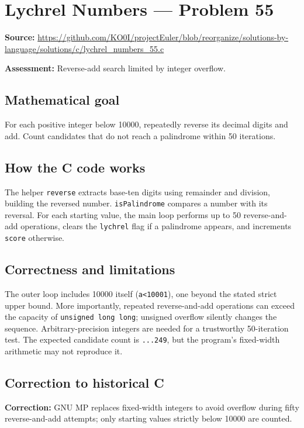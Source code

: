 \section{Lychrel Numbers --- Problem 55}
\label{prob:55}
\noindent\textbf{Source:} \url{https://github.com/KO0I/projectEuler/blob/reorganize/solutions-by-language/solutions/c/lychrel_numbers_55.c}

\noindent\textbf{Assessment:} Reverse-add search limited by integer overflow.

\subsection*{Mathematical goal}
For each positive integer below 10000, repeatedly reverse its decimal digits and add. Count candidates that do not reach a palindrome within 50 iterations.

\subsection*{How the C code works}
The helper \verb|reverse| extracts base-ten digits using remainder and division, building the reversed number. \verb|isPalindrome| compares a number with its reversal. For each starting value, the main loop performs up to 50 reverse-and-add operations, clears the \verb|lychrel| flag if a palindrome appears, and increments \verb|score| otherwise.

\subsection*{Correctness and limitations}
The outer loop includes 10000 itself (\verb|a<10001|), one beyond the stated strict upper bound. More importantly, repeated reverse-and-add operations can exceed the capacity of \verb|unsigned long long|; unsigned overflow silently changes the sequence. Arbitrary-precision integers are needed for a trustworthy 50-iteration test. The expected candidate count is \texttt{...249}, but the program's fixed-width arithmetic may not reproduce it.


\subsection*{Correction to historical C}
{\color{red}\textbf{Correction:} GNU MP replaces fixed-width integers to avoid overflow during fifty reverse-and-add attempts; only starting values strictly below 10000 are counted.}
